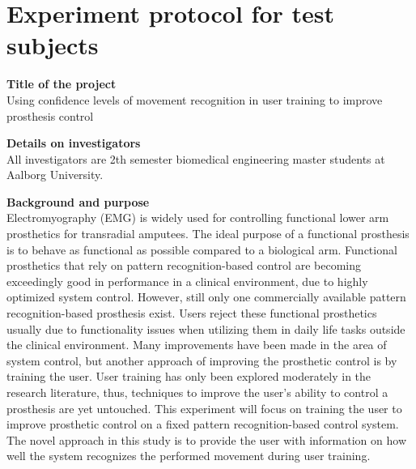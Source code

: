 \section*{Experiment protocol for test subjects} \label{sec:Eprot}

\textbf{Title of the project} \\
Using confidence levels of movement recognition in user training to improve prosthesis control 

\textbf{Details on investigators} \\
All investigators are 2th semester biomedical engineering master students at Aalborg University.  

\textbf{Background and purpose} \\
Electromyography (EMG) is widely used for controlling functional lower arm prosthetics for transradial amputees. The ideal purpose of a functional prosthesis is to behave as functional as possible compared to a biological arm. Functional prosthetics that rely on pattern recognition-based control are becoming exceedingly good in performance in a clinical environment, due to highly optimized system control. However, still only one commercially available pattern recognition-based prosthesis exist. Users reject these functional prosthetics usually due to functionality issues when utilizing them in daily life tasks outside the clinical environment. Many improvements have been made in the area of system control, but another approach of improving the prosthetic control is by training the user. User training has only been explored moderately in the research literature, thus, techniques to improve the user's ability to control a prosthesis are yet untouched. This experiment will focus on training the user to improve prosthetic control on a fixed pattern recognition-based control system. The novel approach in this study is to provide the user with information on how well the system recognizes the performed movement during user training. 


